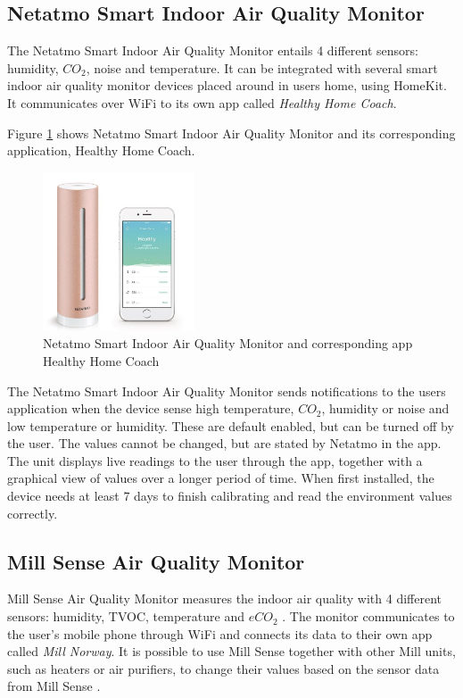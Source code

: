 \subsection{Netatmo Smart Indoor Air Quality Monitor}
The Netatmo Smart Indoor Air Quality Monitor entails 4 different sensors: humidity, \(CO_2\), noise and temperature. It can be integrated with several smart indoor air quality monitor devices placed around in users home, using HomeKit. It communicates over WiFi to its own app called \textit{Healthy Home Coach}. 

Figure \ref{fig:Netatmo} shows Netatmo Smart Indoor Air Quality Monitor and its corresponding application, Healthy Home Coach. 
\begin{figure} [H]
    \centering
    \includegraphics[width=0.4\textwidth]{figures/Netatmo.png}
    \caption{Netatmo Smart Indoor Air Quality Monitor and corresponding app Healthy Home Coach \cite{NetatmoDevice}}
    \label{fig:Netatmo}
\end{figure}

The Netatmo Smart Indoor Air Quality Monitor sends notifications to the users application when the device sense high temperature, \(CO_2\), humidity or noise and low temperature or humidity. These are default enabled, but can be turned off by the user. The values cannot be changed, but are stated by Netatmo in the app. The unit displays live readings to the user through the app, together with a graphical view of values over a longer period of time. When first installed, the device needs at least 7 days to finish calibrating and read the environment values correctly. 

\subsection{Mill Sense Air Quality Monitor}
Mill Sense Air Quality Monitor measures the indoor air quality with 4 different sensors: humidity, \gls{TVOC}, temperature and \(eCO_2\) \cite{Mill}. The monitor communicates to the user's mobile phone through WiFi and connects its data to their own app called \textit{Mill Norway}. It is possible to use Mill Sense together with other Mill units, such as heaters or air purifiers,  to change their values based on the sensor data from Mill Sense \cite{Mill}. 

